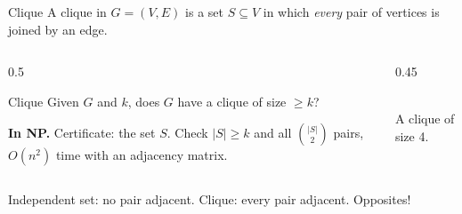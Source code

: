 \documentclass[10pt,aspectratio=169]{beamer}
\begin{document}
\begin{frame}{Clique}
  A \alert{clique} in $G = (V, E)$ is a set $S \subseteq V$ in which
  \emph{every} pair of vertices is joined by an edge.

  \begin{columns}[c]
    \begin{column}{0.5\textwidth}
      \begin{block}{Clique}
        Given $G$ and $k$, does $G$ have a clique of size $\ge k$?
      \end{block}

      \medskip
      \textbf{In NP.} Certificate: the set $S$. Check $|S| \ge k$ and all
      $\binom{|S|}{2}$ pairs, $O(n^2)$ time with an adjacency matrix.
    \end{column}
    \begin{column}{0.45\textwidth}
      \begin{center}
      \\[2pt]
      \small A clique of size 4.
      \end{center}
    \end{column}
  \end{columns}

  \medskip
  Independent set: \alert{no} pair adjacent. Clique: \alert{every} pair
  adjacent. Opposites!
\end{frame}
\end{document}
